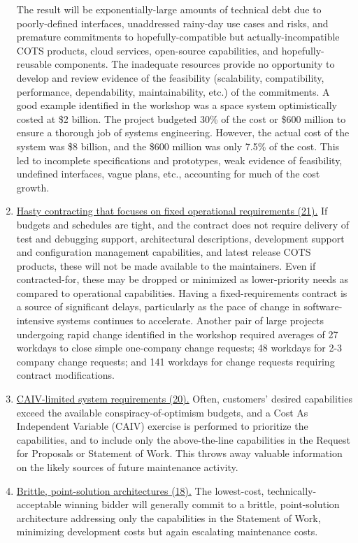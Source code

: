 \begin{enumerate}
	The result will be exponentially-large amounts of technical debt due to poorly-defined interfaces, unaddressed rainy-day use cases and risks, and premature commitments to hopefully-compatible but actually-incompatible COTS products, cloud services, open-source capabilities, and hopefully-reusable components.
	The inadequate resources provide no opportunity to develop and review evidence of the feasibility (scalability, compatibility, performance, dependability, maintainability, etc.) of the commitments.
	A good example identified in the workshop was a space system optimistically costed at \$2 billion.
	The project budgeted 30\% of the cost or \$600 million to ensure a thorough job of systems engineering.
	However, the actual cost of the system was \$8 billion, and the \$600 million was only 7.5\% of the cost.
	This led to incomplete specifications and prototypes, weak evidence of feasibility, undefined interfaces, vague plans, etc., accounting for much of the cost growth.
	\item \ul{Hasty contracting that focuses on fixed operational requirements (21).}
	If budgets and schedules are tight, and the contract does not require delivery of test and debugging support, architectural descriptions, development support and configuration management capabilities, and latest release COTS products, these will not be made available to the maintainers.
	Even if contracted-for, these may be dropped or minimized as lower-priority needs as compared to operational capabilities.
	Having a fixed-requirements contract is a source of significant delays, particularly as the pace of change in software-intensive systems continues to accelerate.
	Another pair of large projects undergoing rapid change identified in the workshop required averages of 27 workdays to close simple one-company change requests; 48 workdays for 2-3 company change requests; and 141 workdays for change requests requiring contract modifications.
	\item  \ul{CAIV-limited system requirements (20).}
	Often, customers' desired capabilities exceed the available conspiracy-of-optimism budgets, and a Cost As Independent Variable (CAIV) exercise is performed to prioritize the capabilities, and to include only the above-the-line capabilities in the Request for Proposals or Statement of Work.
	This throws away valuable information on the likely sources of future maintenance activity.
	\item  \ul{Brittle, point-solution architectures (18).}
	The lowest-cost, technically-acceptable winning bidder will generally commit to a brittle, point-solution architecture addressing only the capabilities in the Statement of Work, minimizing development costs but again escalating maintenance costs. 

\end{enumerate}
